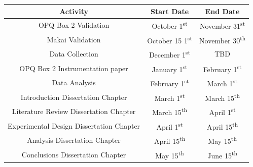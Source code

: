 \begin{center}
\begin{tabular}{ ||c | c c|| }
\hline
 \textbf{Activity} & \textbf{Start Date} & \textbf{End Date} \\ 
 \hline
 \hline
 OPQ Box 2 Validation & October 1\textsuperscript{st} & November 31\textsuperscript{st} \\  
 Makai Validation & October 15 1\textsuperscript{st} & November 30\textsuperscript{th}   \\
 Data Collection & December 1\textsuperscript{st} & TBD   \\
 OPQ Box 2 Instrumentation paper & January 1\textsuperscript{st} & February 1\textsuperscript{st}   \\
 Data Analysis & February 1\textsuperscript{st} & March 1\textsuperscript{st}  \\
 Introduction Dissertation Chapter & March 1\textsuperscript{st}  & March 15\textsuperscript{th}  \\
 Literature Review Dissertation Chapter & March 15\textsuperscript{th} & April 1\textsuperscript{st}  \\
 Experimental Design Dissertation Chapter & April 1\textsuperscript{st} & April 15\textsuperscript{th}  \\
 Analysis Dissertation Chapter & April 15\textsuperscript{th} & May 15\textsuperscript{th}  \\
 Conclusions Dissertation Chapter & May 15\textsuperscript{th} & June 15\textsuperscript{th}  \\
 \hline
 
\end{tabular}
\end{center}
